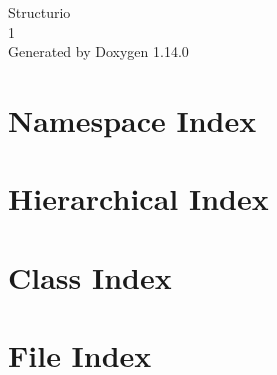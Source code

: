 \documentclass[twoside]{book}
\newcommand{\+}{\discretionary{\mbox{\scriptsize$\hookleftarrow$}}{}{}}
\newcommand{\clearemptydoublepage}{%
    \newpage{\pagestyle{empty}\cleardoublepage}%
  }
\begin{document}
  \raggedbottom
    \hypersetup{pageanchor=false,
                bookmarksnumbered=true,
                pdfencoding=unicode
               }
  \begin{titlepage}
  \vspace*{7cm}
  \begin{center}%
  {\Large Structurio}\\
  [1ex]\large 1 \\
  \vspace*{1cm}
  {\large Generated by Doxygen 1.14.0}\\
  \end{center}
  \end{titlepage}
  \clearemptydoublepage
  \tableofcontents
  \clearemptydoublepage
  \hypersetup{pageanchor=true}
\chapter{Namespace Index}

\chapter{Hierarchical Index}

\chapter{Class Index}

\chapter{File Index}

\end{document}
